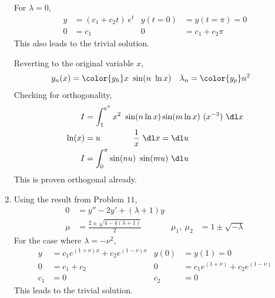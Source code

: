 \begin{enumerate}
          For $ \lambda = 0 $,
          \begin{align}
              y      & = (c_1 + c_2t)\ e^t &
              y(t=0) & = y(t=\pi) = 0        \\
              0      & = c_1               &
              0      & = c_1 + c_2\pi
          \end{align}
          This also leads to the trivial solution. \par
          Reverting to the original variable $ x $,
          \begin{align}
              y_n(x)    & = \color{y_h} x\ \sin(n\ \ln x) &
              \lambda_n & = \color{y_p} n^2
          \end{align}
          Checking for orthogonality,
          \begin{align}
              I      & = \int_{1}^{e^\pi} x^2\ \sin(n \ln x) \sin(m \ln x)
              \ (x^{-3})\ \dl x                                            \\
              \ln(x) & = u \qquad\qquad \frac{1}{x}\ \dl x = \dl u         \\
              I      & = \int_{0}^{\pi} \sin(nu)\ \sin(mu)\ \dl u
          \end{align}
          This is proven orthogonal already.

    \item Using the result from Problem $ 11 $,
          \begin{align}
              0             & = y'' - 2y' + (\lambda + 1)y                  \\
              \mu           & = \frac{2 \pm \sqrt{4 - 4(\lambda + 1)}}{2} &
              \mu_1,\ \mu_2 & = 1 \pm \sqrt{-\lambda}
          \end{align}
          For the case where $ \lambda = -\nu^2 $,
          \begin{align}
              y    & = c_1 e^{(1+\nu)x} + c_2 e^{(1-\nu)x} &
              y(0) & = y(1) = 0                              \\
              0    & = c_1 + c_2                           &
              0    & = c_1e^{(1+\nu)} + c_2 e^{(1-\nu)}      \\
              c_1  & = 0                                   &
              c_2  & = 0
          \end{align}
          This leads to the trivial solution.


\end{enumerate}
